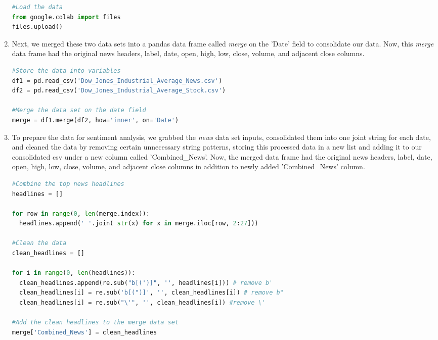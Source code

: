 \documentclass[10pt,twocolumn]{article}
\begin{document}
\begin{enumerate}
\begin{lstlisting}[language=Python, caption=Upload data sets]
#Load the data
from google.colab import files
files.upload()
\end{lstlisting}

    \item Next, we merged these two data sets into a pandas data frame called \textit{merge} on the 'Date' field to consolidate our data. Now, this \textit{merge} data frame had the original news headers, label, date, open, high, low, close, volume, and adjacent close columns.

\begin{lstlisting}[language=Python, caption=Store and merge data]
#Store the data into variables
df1 = pd.read_csv('Dow_Jones_Industrial_Average_News.csv')
df2 = pd.read_csv('Dow_Jones_Industrial_Average_Stock.csv')

#Merge the data set on the date field
merge = df1.merge(df2, how='inner', on='Date')
\end{lstlisting}

    \item To prepare the data for sentiment analysis, we grabbed the \textit{news} data set inputs, consolidated them into one joint string for each date, and cleaned the data by removing certain unnecessary string patterns, storing this processed data in a new list and adding it to our consolidated csv under a new column called 'Combined\_News'. Now, the merged data frame had the original news headers, label, date, open, high, low, close, volume, and adjacent close columns in addition to newly added 'Combined\_News' column.

\begin{lstlisting}[language=Python, caption=Pre-process data]
#Combine the top news headlines
headlines = []

for row in range(0, len(merge.index)):
  headlines.append(' '.join( str(x) for x in merge.iloc[row, 2:27]))
 
#Clean the data
clean_headlines = []

for i in range(0, len(headlines)):
  clean_headlines.append(re.sub("b[(')]", '', headlines[i])) # remove b'
  clean_headlines[i] = re.sub('b[(")]', '', clean_headlines[i]) # remove b"
  clean_headlines[i] = re.sub("\'", '', clean_headlines[i]) #remove \'

#Add the clean headlines to the merge data set
merge['Combined_News'] = clean_headlines
\end{lstlisting}


\end{enumerate}
\end{document}
